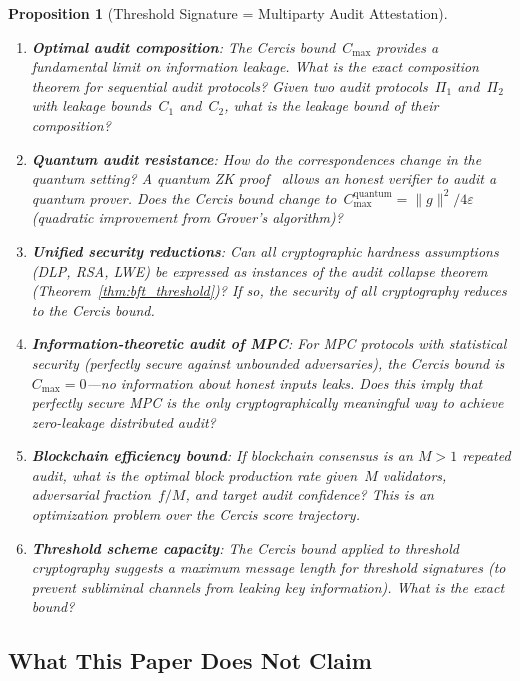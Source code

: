 \documentclass[12pt,a4paper]{article}
\newtheorem{proposition}[theorem]{Proposition}
\theoremstyle{remark}
\newcommand{\Cercis}{\textsf{Cercis}}
\begin{document}
\begin{proposition}[Threshold Signature = Multiparty Audit Attestation]
\begin{enumerate}[leftmargin=*, label=(\arabic*)]
  \item \textbf{Optimal audit composition}: The \Cercis{} bound~$C_{\max}$ provides a fundamental limit on information leakage. What is the exact composition theorem for sequential audit protocols? Given two audit protocols~$\Pi_1$ and~$\Pi_2$ with leakage bounds~$C_1$ and~$C_2$, what is the leakage bound of their composition?
  \item \textbf{Quantum audit resistance}: How do the correspondences change in the quantum setting? A quantum ZK proof~\cite{watrous2006zero} allows an honest verifier to audit a quantum prover. Does the \Cercis{} bound change to~$C_{\max}^{\text{quantum}} = \|g\|^2 / 4\varepsilon$ (quadratic improvement from Grover's algorithm)?
  \item \textbf{Unified security reductions}: Can all cryptographic hardness assumptions (DLP, RSA, LWE) be expressed as instances of the audit collapse theorem (Theorem~\ref{thm:bft_threshold})? If so, the security of all cryptography reduces to the \Cercis{} bound.
  \item \textbf{Information-theoretic audit of MPC}: For MPC protocols with statistical security (perfectly secure against unbounded adversaries), the \Cercis{} bound is~$C_{\max} = 0$---no information about honest inputs leaks. Does this imply that perfectly secure MPC is the only cryptographically meaningful way to achieve zero-leakage distributed audit?
  \item \textbf{Blockchain efficiency bound}: If blockchain consensus is an $M > 1$ repeated audit, what is the optimal block production rate given~$M$ validators, adversarial fraction~$f/M$, and target audit confidence? This is an optimization problem over the \Cercis{} score trajectory.
  \item \textbf{Threshold scheme capacity}: The \Cercis{} bound applied to threshold cryptography suggests a maximum message length for threshold signatures (to prevent subliminal channels from leaking key information). What is the exact bound?
\end{enumerate}

\subsection{What This Paper Does Not Claim}


\end{proposition}
\end{document}
